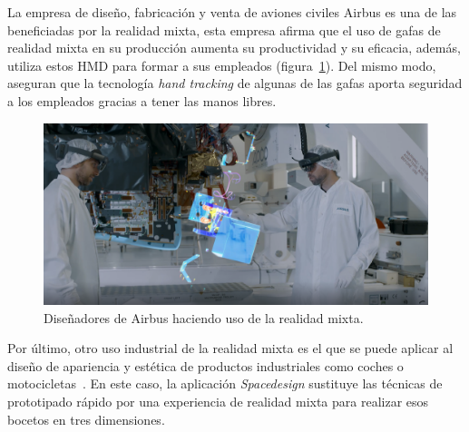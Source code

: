 La empresa de diseño, fabricación y venta de aviones civiles Airbus es una de las beneficiadas por la realidad mixta, esta empresa afirma que el uso de gafas de realidad mixta en su producción aumenta su productividad y su eficacia, además, utiliza estos HMD para formar a sus empleados (figura~\ref{fig:ingenierosAirbusHololens2}). Del mismo modo, aseguran que la tecnología \textit{hand tracking} de algunas de las gafas aporta seguridad a los empleados gracias a tener las manos libres. \\

\begin{figure}[h]
    \centering
    \includegraphics[scale=0.3]{Images/Estado del arte/ingenierosAirbus.png}
    \caption[Diseñadores de Airbus haciendo uso de la realidad mixta]{Diseñadores de Airbus haciendo uso de la realidad mixta\footnotemark.}
    \label{fig:ingenierosAirbusHololens2}
\end{figure}


Por último, otro uso industrial de la realidad mixta es el que se puede aplicar al diseño de apariencia y estética de productos industriales como coches o motocicletas~\cite{mrinaesthethics}. En este caso, la aplicación \textit{Spacedesign} sustituye las técnicas de prototipado rápido por una experiencia de realidad mixta para realizar esos bocetos en tres dimensiones.
